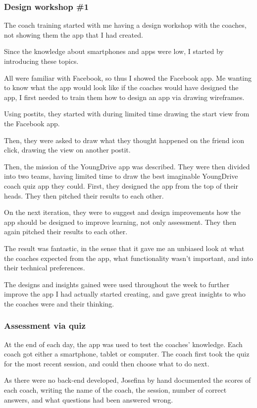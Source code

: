 \subsubsection{Design workshop \#1}
The coach training started with me having a design workshop with the coaches, not showing them the app that I had created.

Since the knowledge about smartphones and apps were low, I started by introducing these topics.

All were familiar with Facebook, so thus I showed the Facebook app. Me wanting to know what the app would look like if the coaches would have designed the app, I first needed to train them how to design an app via drawing wireframes.

Using postits, they started with during limited time drawing the start view from the Facebook app.

Then, they were asked to draw what they thought happened on the friend icon click, drawing the view on another postit.

Then, the mission of the YoungDrive app was described. They were then divided into two teams, having limited time to draw the best imaginable YoungDrive coach quiz app they could. First, they designed the app from the top of their heads. They then pitched their results to each other.

On the next iteration, they were to suggest and design improvements how the app should be designed to improve learning, not only assessment. They then again pitched their results to each other.

The result was fantastic, in the sense that it gave me an unbiased look at what the coaches expected from the app, what functionality wasn't important, and into their technical preferences.

The designs and insights gained were used throughout the week to further improve the app I had actually started creating, and gave great insights to who the coaches were and their thinking.

\subsubsection{Assessment via quiz}
At the end of each day, the app was used to test the coaches' knowledge. Each coach got either a smartphone, tablet or computer. The coach first took the quiz for the most recent session, and could then choose what to do next.

As there were no back-end developed, Josefina by hand documented the scores of each coach, writing the name of the coach, the session, number of correct answers, and what questions had been answered wrong.


